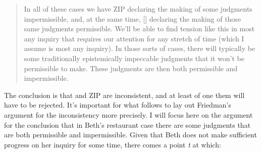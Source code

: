 \documentclass[12pt]{article}
\begin{document}
\begin{quote}
    In all of these cases we have ZIP declaring the making of some judgments impermissible, and, at the same time, [\ep{}] declaring the making of those same judgments permissible. We’ll be able to find tension like this in most any inquiry that requires our attention for any stretch of time (which I assume is most any inquiry). In those sorts of cases, there will typically be some traditionally epistemically impeccable judgments that it won’t be permissible to make. These judgments are then both permissible and impermissible.
\end{quote}
%
The conclusion is that \ep{} and ZIP are inconsistent, and at least of one them will have to be rejected. It's important for what follows to lay out Friedman's argument for the inconsistency more precisely. I will focus here on the argument for the conclusion that in Beth's restaurant case there are some judgments that are both permissible and impermissible. Given that Beth does not make sufficient progress on her inquiry  for some time, there comes a point \textit{t} at which:
\end{document}
